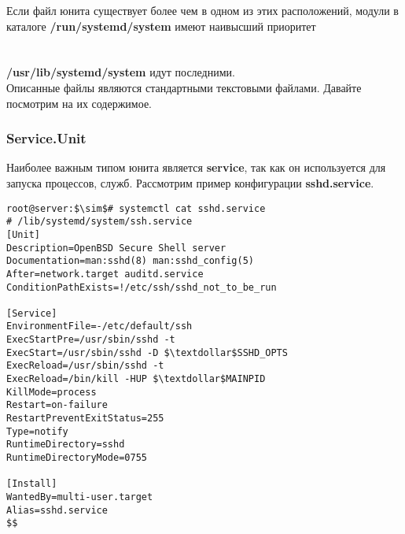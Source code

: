 \documentclass[14pt, a4paper]{article}
\begin{document}
Если файл юнита существует более чем в одном из этих расположений, модули в каталоге
\textbf{/run/systemd/system} имеют наивысший приоритет \\
 \\
 \\
\textbf{/usr/lib/systemd/system} идут последними.\\

Описанные файлы являются стандартными текстовыми файлами. Давайте посмотрим на их
содержимое.

\subsubsection*{Service.Unit} 

Наиболее важным типом юнита является \textbf{service}, так как он используется для запуска процессов,
служб. Рассмотрим пример конфигурации \textbf{sshd.service}.

\vspace{0.3cm}

\begin{lstlisting}
root@server:$\sim$# systemctl cat sshd.service
# /lib/systemd/system/ssh.service
[Unit]
Description=OpenBSD Secure Shell server
Documentation=man:sshd(8) man:sshd_config(5)
After=network.target auditd.service
ConditionPathExists=!/etc/ssh/sshd_not_to_be_run

[Service]
EnvironmentFile=-/etc/default/ssh
ExecStartPre=/usr/sbin/sshd -t
ExecStart=/usr/sbin/sshd -D $\textdollar$SSHD_OPTS
ExecReload=/usr/sbin/sshd -t
ExecReload=/bin/kill -HUP $\textdollar$MAINPID
KillMode=process
Restart=on-failure
RestartPreventExitStatus=255
Type=notify
RuntimeDirectory=sshd
RuntimeDirectoryMode=0755

[Install]
WantedBy=multi-user.target
Alias=sshd.service
$$
\end{lstlisting}

\vspace{0.2cm}
\end{document}
